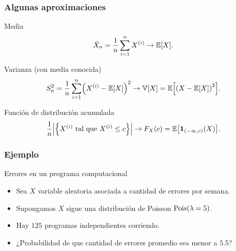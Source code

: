 \documentclass[table]{beamer}
\begin{document}
\begin{frame}
    \frametitle{Algunas aproximaciones}
    \begin{block}{Media}
        \begin{equation*}
            \bar{X}_{n} = \frac{1}{n} \sum_{i = 1}^{n} X^{\parens{i}} \to \expected{X} .
        \end{equation*}
    \end{block}
    \begin{block}{Varianza (con media conocida)}
        \begin{equation*}
            S^{2}_{n} = \frac{1}{n} \sum_{i = 1}^{n} \parens{X^{\parens{i}} - \expected{X}}^{2} \to \variance{X} = \expected{\parens{X - \expected{X}}^{2}} .
        \end{equation*}
    \end{block}
    \begin{block}{Función de distribución acumulada}
        \begin{equation*}
            \frac{1}{n} \vparens{\bparens{X^{\parens{i}} \text{ tal que } X^{\parens{i}} \leq c}} \to \pFF{X}{c} = \expected{\indicator{\parens{- \infty , c}}{X}} .
        \end{equation*}
    \end{block}
\end{frame}

\begin{frame}
    \frametitle{Ejemplo}
    \begin{block}{Errores en un programa computacional}
        \begin{itemize}
            \item Sea $X$ variable aleatoria asociada a cantidad de errores por semana.
            \item Supongamos $X$ sigue una distribución de Poisson $\poisson{\lambda = 5}$.
            \item Hay $125$ programas independientes corriendo.
            \item ¿Probabilidad de que cantidad de errores promedio sea menor a $5.5$?
        \end{itemize}
    \end{block}
\end{frame}
\end{document}
